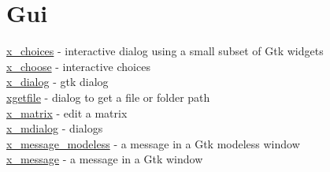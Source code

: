 \chapter*{Gui}

\hyperlink{x_choices}{x\_choices} - interactive dialog using a small subset of Gtk widgets\\
\hyperlink{x_choose}{x\_choose} - interactive choices\\
\hyperlink{x_dialog}{x\_dialog} - gtk dialog\\
\hyperlink{xgetfile}{xgetfile} - dialog to get a file or folder path\\
\hyperlink{x_matrix}{x\_matrix} - edit a matrix\\
\hyperlink{x_mdialog}{x\_mdialog} - dialogs\\
\hyperlink{x_message_modeless}{x\_message\_modeless} - a message in a Gtk modeless window\\
\hyperlink{x_message}{x\_message} - a message in a Gtk window\\












